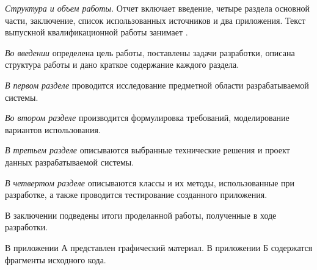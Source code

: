 \emph{Структура и объем работы.} Отчет включает введение, четыре раздела основной части, заключение, список использованных источников и два приложения. Текст выпускной квалификационной работы занимает .

\emph{Во введении} определена цель работы, поставлены задачи разработки, описана структура работы и дано краткое содержание каждого раздела.

\emph{В первом разделе} проводится исследование предметной области разрабатываемой системы.

\emph{Во втором разделе} производится формулировка требований, моделирование вариантов использования.

\emph{В третьем разделе} описываются выбранные технические решения и проект данных разрабатываемой системы.

\emph{В четвертом разделе} описываются классы и их методы, использованные при разработке, а также проводится тестирование созданного приложения.

В заключении подведены итоги проделанной работы, полученные в ходе разработки.

В приложении А представлен графический материал.
В приложении Б содержатся фрагменты исходного кода.
